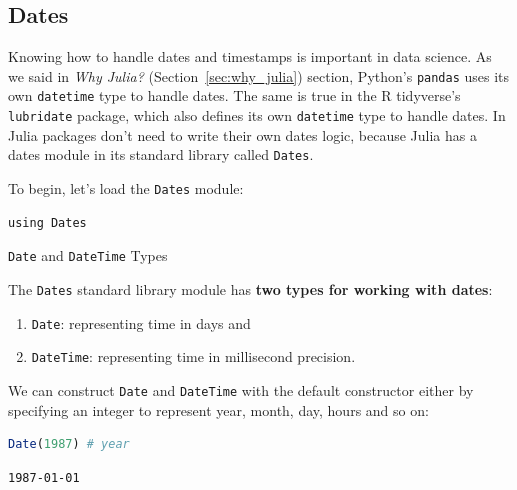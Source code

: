 \documentclass[
  notoc %
]{tufte-book}
\makeatletter
\providecommand{\tightlist}{%
  \setlength{\itemsep}{0pt}\setlength{\parskip}{0pt}
}
\newcommand{\passthrough}[1]{#1}
\renewcommand\subsubsection{%
\@startsection{subsubsection}{3}{\z@ }{-3.25ex\@plus -1ex \@minus -.2ex}{1.5ex \@plus .2ex}{\normalfont \normalsize \bfseries }
}
\makeatother
\begin{document}
\hypertarget{sec:dates}{%
\subsection{Dates}\label{sec:dates}}

Knowing how to handle dates and timestamps is important in data science.
As we said in \emph{Why Julia?} (Section~\ref{sec:why_julia}) section,
Python's \passthrough{\lstinline!pandas!} uses its own
\passthrough{\lstinline!datetime!} type to handle dates. The same is
true in the R tidyverse's \passthrough{\lstinline!lubridate!} package,
which also defines its own \passthrough{\lstinline!datetime!} type to
handle dates. In Julia packages don't need to write their own dates
logic, because Julia has a dates module in its standard library called
\passthrough{\lstinline!Dates!}.

To begin, let's load the \passthrough{\lstinline!Dates!} module:

\begin{lstlisting}
using Dates
\end{lstlisting}

\hypertarget{sec:dates_types}{%
\subsubsection{\texorpdfstring{\texttt{Date} and \texttt{DateTime}
Types}{Date and DateTime Types}}\label{sec:dates_types}}

The \passthrough{\lstinline!Dates!} standard library module has
\textbf{two types for working with dates}:

\begin{enumerate}
\def\labelenumi{\arabic{enumi}.}
\tightlist
\item
  \passthrough{\lstinline!Date!}: representing time in days and
\item
  \passthrough{\lstinline!DateTime!}: representing time in millisecond
  precision.
\end{enumerate}

We can construct \passthrough{\lstinline!Date!} and
\passthrough{\lstinline!DateTime!} with the default constructor either
by specifying an integer to represent year, month, day, hours and so on:

\begin{lstlisting}[language=Julia]
Date(1987) # year
\end{lstlisting}

\begin{lstlisting}[language=Output]
1987-01-01
\end{lstlisting}
\end{document}
